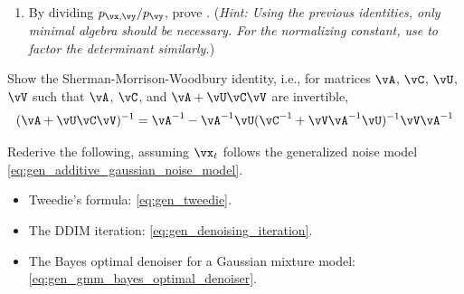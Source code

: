 \documentclass[../../book-main.tex]{subfiles}
\begin{document}
\begin{exercise}
\begin{enumerate}
\begin{align}
\begin{bmatrix}
          \vSigma_{\vx\vy}^{\top}\right)^{-1} & \Zero \\
          \Zero & \vSigma_{\vy}^{-1}
        \end{bmatrix}
        \begin{bmatrix}
          \vx - \left(\vmu_{\vx} + \vSigma_{\vx\vy}\vSigma_{\vy}^{-1}(\vy
          - \vmu_{\vy})\right) \\
          \vy - \vmu_{\vy}
        \end{bmatrix}.
      \end{align}
      (\textit{Hint: To economize algebraic manipulations, note that the first
      and last matrices on the RHS of
       are transposes of one
      another.})
    \item By dividing $p_{\vx, \vy} / p_{\vy}$, prove
      . (\textit{Hint: Using the previous
      identities, only minimal algebra should be necessary. For the normalizing
      constant, use  to
      factor the determinant similarly.})

  \end{enumerate}


\end{exercise}

\begin{exercise}\label{exercise:sherman_morrison_woodbury_identity}
    Show the Sherman-Morrison-Woodbury identity, i.e., for matrices \(\vA\), \(\vC\), \(\vU\), \(\vV\) such that \(\vA\), \(\vC\), and \(\vA + \vU\vC\vV\) are invertible,
    \begin{equation}
        (\vA + \vU\vC\vV)^{-1} = \vA^{-1} - \vA^{-1}\vU(\vC^{-1} + \vV\vA^{-1}\vU)^{-1}\vV\vA^{-1}
    \end{equation}
\end{exercise}

\begin{exercise}\label{exercise:generalizing_results_to_different_noise_models}
    Rederive the following, assuming \(\vx_{t}\) follows the generalized noise model \eqref{eq:gen_additive_gaussian_noise_model}.
    \begin{itemize}
        \item Tweedie's formula: \eqref{eq:gen_tweedie}.
        \item The DDIM iteration: \eqref{eq:gen_denoising_iteration}.
        \item The Bayes optimal denoiser for a Gaussian mixture model: \eqref{eq:gen_gmm_bayes_optimal_denoiser}.
    \end{itemize}
\end{exercise}
\end{document}
